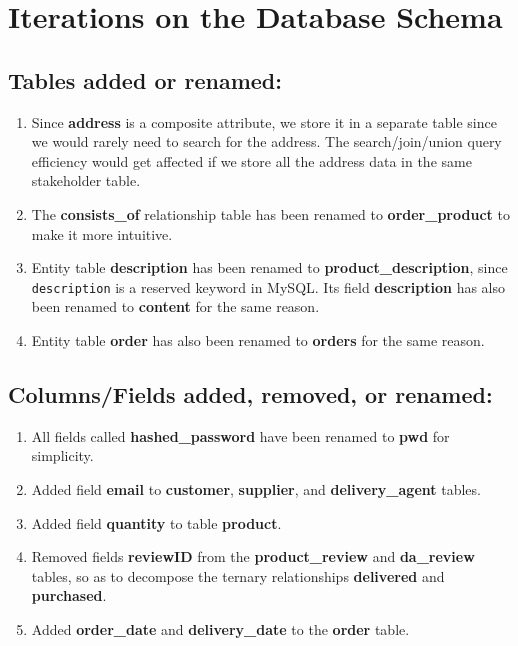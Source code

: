 \documentclass[12pt]{report}
\begin{document}
    \section*{\Huge Iterations on the Database Schema}
    \subsection*{Tables added or renamed:}
    \begin{enumerate}
        \item
        Since \textbf{address} is a composite attribute, we store it in a separate table since we would rarely need to search for the address.
        The search/join/union query efficiency would get affected if we store all the address data in the same stakeholder table.
        \item
        The \textbf{consists\_of} relationship table has been renamed to \textbf{order\_product} to make it more intuitive.
        \item
        Entity table \textbf{description} has been renamed to \textbf{product\_description}, since \texttt{description} is a reserved keyword in MySQL.
        Its field \textbf{description} has also been renamed to \textbf{content} for the same reason.
        \item
        Entity table \textbf{order} has also been renamed to \textbf{orders} for the same reason.
    \end{enumerate}

    \subsection*{Columns/Fields added, removed, or renamed:}
    \begin{enumerate}
        \item
        All fields called \textbf{hashed\_password} have been renamed to \textbf{pwd} for simplicity.
        \item
        Added field \textbf{email} to \textbf{customer}, \textbf{supplier}, and \textbf{delivery\_agent} tables.
        \item
        Added field \textbf{quantity} to table \textbf{product}.
        \item
        Removed fields \textbf{reviewID} from the \textbf{product\_review} and \textbf{da\_review} tables,
        so as to decompose the ternary relationships \textbf{delivered} and \textbf{purchased}.
        \item
        Added \textbf{order\_date} and \textbf{delivery\_date} to the \textbf{order} table.
    \end{enumerate}
\end{document}
